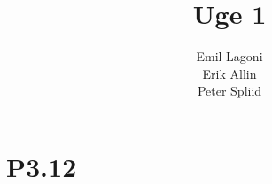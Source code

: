 \documentclass[12pt,a4paper]{article}
\title{Uge 1}
\author{Emil Lagoni\\Erik Allin\\Peter Spliid}
\begin{document}
\maketitle
\section*{P3.12}
 
\end{document}
